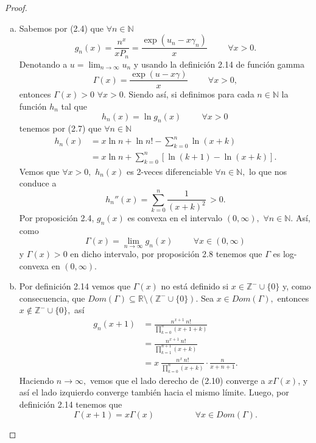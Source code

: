 \begin{proof}
	\begin{enumerate}[(a)]
		\item Sabemos por (2.4) que $\forall n \in \mathbb{N}$ $$g_n(x) = \frac{n^x}{xP_n} = \frac{\exp(u_n-x\gamma_n)}{x}\hspace{1cm}\forall x > 0.$$ Denotando a $u = \lim_{n \rightarrow \infty}u_n$ y usando la definición 2.14 de función gamma $$\Gamma(x) = \frac{\exp(u-x\gamma)}{x}\hspace{1cm}\forall x > 0,$$ entonces $\Gamma(x) > 0$ $\forall x > 0.$ Siendo así, si definimos para cada $n \in \mathbb{N}$ la función $h_n$ tal que $$h_n(x) = \ln g_n(x)\hspace{1cm}\forall x > 0\,$$ tenemos por (2.7) que $\forall n \in \mathbb{N}$
		\begin{align*}
		h_n(x) &= x\ln n + \ln n! - \sum_{k = 0}^{n}\ln (x+k)\\
		&= x\ln n + \sum_{k = 0}^{n}\left[\ln (k+1)-\ln (x+k)\right].
		\end{align*}
		Vemos que $\forall x > 0,$ $h_n(x)$ es 2-veces diferenciable $\forall n \in \mathbb{N},$ lo que nos conduce a $$h_n''(x) = \sum_{k = 0}^{n}\frac{1}{(x+k)^2}\, > 0.$$ Por proposición 2.4, $g_n(x)$ es convexa en el intervalo $(0,\infty),$ $\forall n \in \mathbb{N}.$ Así, como $$\Gamma(x) = \lim_{n \rightarrow \infty}g_n(x)\hspace{1cm}\forall x \in (0,\infty)$$ y $\Gamma(x) > 0$ en dicho intervalo, por proposición 2.8 tenemos que $\Gamma$ es log-convexa en $(0,\infty).$
		\item Por definición 2.14 vemos que $\Gamma(x)$ no está definido si $x \in \mathbb{Z}^-\cup \{0\}$ y, como consecuencia, que $Dom(\Gamma) \subseteq \mathbb{R}\texttt{\textbackslash}(\mathbb{Z}^-\cup\{0\}).$
		Sea $x \in Dom(\Gamma),$ entonces $x \notin \mathbb{Z}^-\cup\{0\},$ así
		\begin{align}
			g_n(x+1) &= \frac{n^{x+1}\ n!}{\prod_{k = 0}^{n}(x+1+k)} \nonumber\\
			&= \frac{n^{x+1}\ n!}{\prod_{k = 1}^{n+1}(x+k)} \nonumber \\
			&= x\ \frac{n^x\ n!}{\prod_{k = 0}^{n}(x+k)}\cdot \frac{n}{x+n+1}.
		\end{align}
		Haciendo $n \rightarrow \infty,$ vemos que el lado derecho de (2.10) converge a $x\Gamma(x)$, y así el lado izquierdo converge también hacia el mismo límite. Luego, por definición 2.14 tenemos que $$\Gamma(x+1) = x\Gamma(x)\hspace{2cm}\forall x \in Dom(\Gamma).$$

\end{enumerate}
\end{proof}
